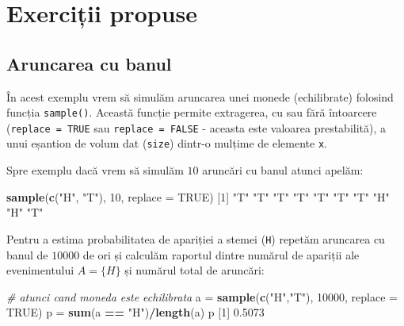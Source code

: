 \documentclass[]{article}
\newenvironment{Shaded}{\begin{snugshade}}{\end{snugshade}}
\newcommand{\CommentTok}[1]{\textcolor[rgb]{0.56,0.35,0.01}{\textit{#1}}}
\newcommand{\DataTypeTok}[1]{\textcolor[rgb]{0.13,0.29,0.53}{#1}}
\newcommand{\DecValTok}[1]{\textcolor[rgb]{0.00,0.00,0.81}{#1}}
\newcommand{\FloatTok}[1]{\textcolor[rgb]{0.00,0.00,0.81}{#1}}
\newcommand{\KeywordTok}[1]{\textcolor[rgb]{0.13,0.29,0.53}{\textbf{#1}}}
\newcommand{\NormalTok}[1]{#1}
\newcommand{\OperatorTok}[1]{\textcolor[rgb]{0.81,0.36,0.00}{\textbf{#1}}}
\newcommand{\OtherTok}[1]{\textcolor[rgb]{0.56,0.35,0.01}{#1}}
\newcommand{\StringTok}[1]{\textcolor[rgb]{0.31,0.60,0.02}{#1}}
\begin{document}
\hypertarget{exerciux21bii-propuse}{%
\section{Exerciții propuse}\label{exerciux21bii-propuse}}

\hypertarget{aruncarea-cu-banul}{%
\subsection{Aruncarea cu banul}\label{aruncarea-cu-banul}}

În acest exemplu vrem să simulăm aruncarea unei monede (echilibrate)
folosind funcția \texttt{sample()}. Această funcție permite extragerea,
cu sau fără întoarcere (\texttt{replace\ =\ TRUE} sau
\texttt{replace\ =\ FALSE} - aceasta este valoarea prestabilită), a unui
eșantion de volum dat (\texttt{size}) dintr-o mulțime de elemente
\texttt{x}.

Spre exemplu dacă vrem să simulăm \(10\) aruncări cu banul atunci
apelăm:

\begin{Shaded}
\begin{Highlighting}[]
\KeywordTok{sample}\NormalTok{(}\KeywordTok{c}\NormalTok{(}\StringTok{"H"}\NormalTok{, }\StringTok{"T"}\NormalTok{), }\DecValTok{10}\NormalTok{, }\DataTypeTok{replace =} \OtherTok{TRUE}\NormalTok{)}
\NormalTok{ [}\DecValTok{1}\NormalTok{] }\StringTok{"T"} \StringTok{"T"} \StringTok{"T"} \StringTok{"T"} \StringTok{"T"} \StringTok{"T"} \StringTok{"T"} \StringTok{"H"} \StringTok{"H"} \StringTok{"T"}
\end{Highlighting}
\end{Shaded}

Pentru a estima probabilitatea de apariției a stemei (\texttt{H})
repetăm aruncarea cu banul de \(10000\) de ori și calculăm raportul
dintre numărul de apariții ale evenimentului \(A=\{H\}\) și numărul
total de aruncări:

\begin{Shaded}
\begin{Highlighting}[]
\CommentTok{# atunci cand moneda este echilibrata}
\NormalTok{a =}\StringTok{ }\KeywordTok{sample}\NormalTok{(}\KeywordTok{c}\NormalTok{(}\StringTok{"H"}\NormalTok{,}\StringTok{"T"}\NormalTok{), }\DecValTok{10000}\NormalTok{, }\DataTypeTok{replace =} \OtherTok{TRUE}\NormalTok{)}
\NormalTok{p =}\StringTok{ }\KeywordTok{sum}\NormalTok{(a }\OperatorTok{==}\StringTok{ "H"}\NormalTok{)}\OperatorTok{/}\KeywordTok{length}\NormalTok{(a)}
\NormalTok{p}
\NormalTok{[}\DecValTok{1}\NormalTok{] }\FloatTok{0.5073}
\end{Highlighting}
\end{Shaded}
\end{document}
